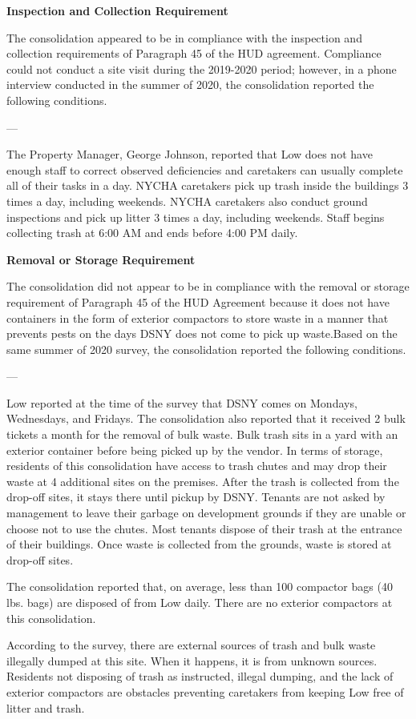  

\textbf{Inspection and Collection Requirement} 

 

The consolidation appeared to be in compliance with the inspection and collection requirements of Paragraph 45 of the HUD agreement. Compliance could not conduct a site visit during the 2019-2020 period; however, in a phone interview conducted in the summer of 2020, the consolidation reported the following conditions.

--- 

The Property Manager, George Johnson, reported that Low does not have enough staff to correct observed deficiencies and caretakers can usually complete all of their tasks in a day. NYCHA caretakers pick up trash inside the buildings 3 times a day, including weekends. NYCHA caretakers also conduct ground inspections and pick up litter 3 times a day, including weekends. Staff begins collecting trash at 6:00 AM and ends before 4:00 PM daily. 

 

\textbf{Removal or Storage Requirement} 

The consolidation did not appear to be in compliance with the  removal or storage requirement of Paragraph  45 of the HUD Agreement because it does not have containers in the form of exterior compactors to store waste in a manner that prevents pests on the days DSNY does not come to pick up waste.Based on the same summer of  2020 survey, the consolidation reported the following conditions. 

 

--- 

Low reported at the time of the survey that DSNY comes on Mondays, Wednesdays, and Fridays. The consolidation also reported that it received 2 bulk tickets a month for the removal of bulk waste. Bulk trash sits in a yard with an exterior container before being picked up by the vendor. In terms of storage, residents of this consolidation have access to trash chutes and may drop their waste at 4 additional sites on the premises. After the trash is collected from the drop-off sites, it stays there until pickup by DSNY. Tenants are not asked by management to leave their garbage on development grounds if they are unable or choose not to use the chutes. Most tenants dispose of their trash at the entrance of their buildings. Once waste is collected from the grounds, waste is stored at drop-off sites.  

 

The consolidation reported that, on average, less than 100 compactor bags (40 lbs. bags) are disposed of from Low daily. There are no exterior compactors at this consolidation.

 

According to the survey, there are external sources of trash and bulk waste illegally dumped at this site. When it happens, it is from unknown sources. Residents not disposing of trash as instructed, illegal dumping, and the lack of exterior compactors are obstacles preventing caretakers from keeping Low free of litter and trash. 

  